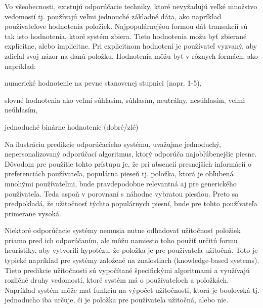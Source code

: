 Vo všeobecnosti, existujú odporúčacie techniky, ktoré nevyžadujú veľké množstvo vedomostí tj. používajú veľmi jednouché základné dáta, ako napríklad používateľove hodnotenia položiek. Najpopulárnejšou formou dát transakcií sú tak isto hodnotenia, ktoré systém zbiera. Tieto hodnotenia možu byť zbierané explicitne, alebo implicitne. Pri explicitnom hodnotení je používateľ vyzvaný, aby zdieľal svoj názor na danú položku. Hodnotenia môžu byť v rôznych formách, ako napríklad:
 \begin{itemize}[leftmargin=*]
{\item numerické hodnotenie na pevne stanovenej stupnici (napr. 1-5),}
{\item slovné hodnotenia ako veľmí súhlasím, súhlasím, neutrálny, nesúhlasím, veľmi neúhlasím,}
{\item jednoduché binárne hodnotenie (dobré/zlé)}
\end{itemize} 

 
Na ilustráciu predikcie odporúčacieho systému, uvažujme jednoduchý, nepersonalizovaný odporúčací algoritmus, ktorý odporúča najobľúbenejšie piesne. Dôvodom pre použitie tohto prístupu je, že pri absencií presnejších informácií o preferenciách používateľa, populárna pieseň tj. položka, ktorá je obľubená mnohými používateľmi, bude pravdepodobne relevantná aj pre generického používateľa. Teda aspoň v porovnaní s náhodne vybratou piesňou. Preto sa predpokladá, že užitočnosť týchto populárnych piesní, bude pre tohto používateľa primerane vysoká.

Niektoré odporúčacie systémy nemusia nutne odhadovať užitočnosť položiek priamo pred ich odporúčaním, ale môžu namiesto toho použiť určitú formu heuristiky, aby vytvorili hypotézu, že položka je pre používateľa užitočná. Toto je typické napríklad pre systémy založené na znalostiach (knowledge-based systems). Tieto predikcie užitočnosti sú vypočítané špecifickými algoritmami a využívajú rozličné druhy vedomostí, ktoré systém má o používateľoch a položkách. Napríklad systém môže mať funkciu na výpočet užitočnosti, ktorá je boolovská tj. jednoducho iba určuje, či je položka pre používateľa užitočná, alebo nie. \\

